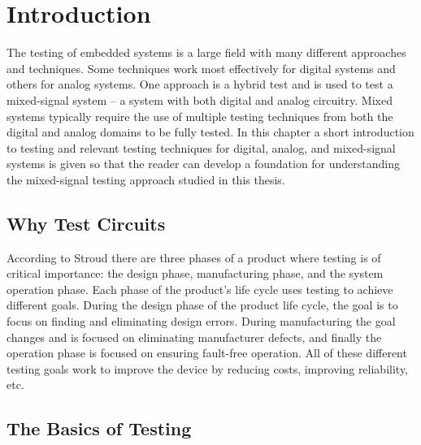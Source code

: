 \documentclass[12pt]{report}
\begin{document}
\normalem       %


\chapter{Introduction}  %

The testing of embedded systems is a large field with many different approaches and techniques.  Some techniques work most effectively for digital systems and others for analog systems.  One approach is a hybrid test and is used to test a mixed-signal system -- a system with both digital and analog circuitry.  Mixed systems typically require the use of multiple testing techniques from both the digital and analog domains to be fully tested.  In this chapter a short introduction to testing and relevant testing techniques for digital, analog, and mixed-signal systems is given so that the reader can develop a foundation for understanding the mixed-signal testing approach studied in this thesis. 

\section{Why Test Circuits}
\label{sct:whytest}
According to Stroud\cite{stroud} there are three phases of a product where testing is of critical importance: the design phase, manufacturing phase, and the system operation phase.  Each phase of the product's life cycle uses testing to achieve different goals.  During the design phase of the product life cycle, the goal is to focus on finding and eliminating design errors.  During manufacturing the goal changes and is focused on eliminating manufacturer defects, and finally the operation phase is focused on ensuring fault-free operation.  All of these different testing goals work to improve the device by reducing costs, improving reliability, etc.  

\section{The Basics of Testing}
\label{sct:basictesting}
\end{document}
